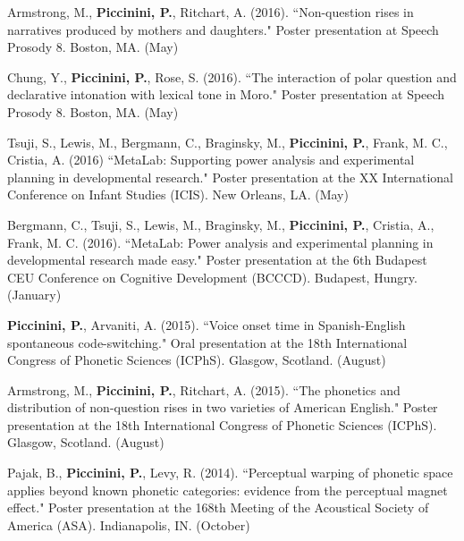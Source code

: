 \documentclass[9pt]{article}
\newenvironment{changemargin}[2]{%
  \begin{list}{}{%
    \setlength{\topsep}{0pt}%
    \setlength{\leftmargin}{#1}%
    \setlength{\rightmargin}{#2}%
    \setlength{\listparindent}{\parindent}%
    \setlength{\itemindent}{\parindent}%
    \setlength{\parsep}{\parskip}%
  }%
  \item[]}{\end{list}
}
\newenvironment{body} {
	\vspace*{-16pt}
	\begin{changemargin}{-0.25in}{-0.5in}
  }	
	{\end{changemargin}
}
\begin{document}
\begin{body}
	\vspace{14pt}
	
	Armstrong, M., \textbf{Piccinini, P.}, Ritchart, A. (2016). ``Non-question rises in narratives produced by mothers and daughters." Poster presentation at Speech Prosody 8. Boston, MA. (May)\\
	\medskip
	
	Chung, Y., \textbf{Piccinini, P.}, Rose, S. (2016). ``The interaction of polar question and declarative intonation with lexical tone in Moro." Poster presentation at Speech Prosody 8. Boston, MA. (May)\\
	\medskip
	
	Tsuji, S.,  Lewis, M., Bergmann, C., Braginsky, M., \textbf{Piccinini, P.}, Frank, M. C., Cristia, A. (2016) ``MetaLab: Supporting power analysis and experimental planning in developmental research." Poster presentation at the XX International Conference on Infant Studies (ICIS). New Orleans, LA. (May)\\
	\medskip
	
	Bergmann, C., Tsuji, S., Lewis, M., Braginsky, M., \textbf{Piccinini, P.}, Cristia, A., Frank, M. C. (2016). ``MetaLab: Power analysis and experimental planning in developmental research made easy." Poster presentation at the 6th Budapest CEU Conference on Cognitive Development (BCCCD). Budapest, Hungry. (January)\\
	\medskip
	
	\textbf{Piccinini, P.}, Arvaniti, A. (2015). ``Voice onset time in Spanish-English spontaneous code-switching." Oral presentation at the 18th International Congress of Phonetic Sciences (ICPhS). Glasgow, Scotland. (August)\\
	\medskip
	
	Armstrong, M., \textbf{Piccinini, P.}, Ritchart, A. (2015). ``The phonetics and distribution of non-question rises in two varieties of American English." Poster presentation at the 18th International Congress of Phonetic Sciences (ICPhS). Glasgow, Scotland. (August)\\
	\medskip

	Pajak, B., \textbf{Piccinini, P.}, Levy, R. (2014). ``Perceptual warping of phonetic space applies beyond known phonetic categories: evidence from the perceptual magnet effect." Poster presentation at the 168th Meeting of the Acoustical Society of America (ASA). Indianapolis, IN. (October)\\
	\medskip


\end{body}
\end{document}
